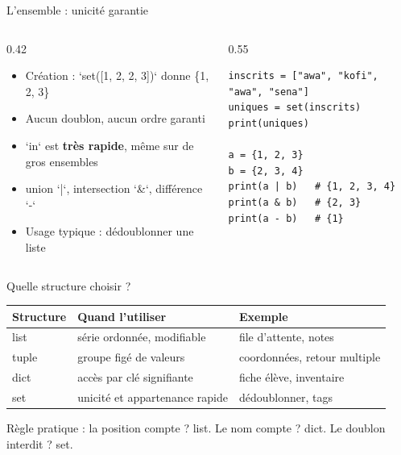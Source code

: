 \documentclass[aspectratio=169,11pt]{beamer}
\begin{document}
\begin{frame}[fragile]{L'ensemble : unicité garantie}
\begin{columns}[t]
\begin{column}{0.42\textwidth}
\begin{itemize}
  \setlength{\itemsep}{1.5pt}\setlength{\parskip}{0pt}
  \item Création : `set([1, 2, 2, 3])` donne \{1, 2, 3\}
  \item Aucun doublon, aucun ordre garanti
  \item `in` est \textbf{très rapide}, même sur de gros ensembles
  \item union `|`, intersection `\&`, différence `-`
  \item Usage typique : dédoublonner une liste
\end{itemize}
\end{column}
\hspace{0.02\textwidth}
\begin{column}{0.55\textwidth}
\begin{lstlisting}[style=pysmall]
inscrits = ["awa", "kofi", "awa", "sena"]
uniques = set(inscrits)
print(uniques)

a = {1, 2, 3}
b = {2, 3, 4}
print(a | b)   # {1, 2, 3, 4}
print(a & b)   # {2, 3}
print(a - b)   # {1}
\end{lstlisting}
\end{column}
\end{columns}
\end{frame}

\begin{frame}{Quelle structure choisir ?}
\renewcommand{\arraystretch}{1.3}\small
\begin{center}
\begin{tabular}{lll}
\toprule
\textbf{\color{PyBleu}Structure} & \textbf{\color{PyBleu}Quand l'utiliser} & \textbf{\color{PyBleu}Exemple} \\
\midrule
list & série ordonnée, modifiable & file d'attente, notes \\
tuple & groupe figé de valeurs & coordonnées, retour multiple \\
dict & accès par clé signifiante & fiche élève, inventaire \\
set & unicité et appartenance rapide & dédoublonner, tags \\
\bottomrule
\end{tabular}
\end{center}

\vspace{4pt}

{\small\color{PyGris}Règle pratique : la position compte ? list. Le nom compte ? dict. Le doublon interdit ? set.}
\end{frame}
\end{document}
